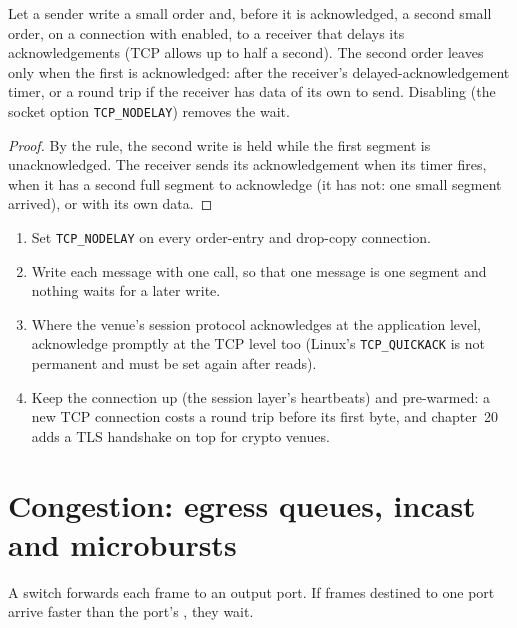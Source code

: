 \begin{proposition}\label{prop:nw:networking-for-trading:nagle}
Let a sender write a small order and, before it is acknowledged, a second small order, on a connection with 
enabled, to a receiver that delays its acknowledgements (TCP allows up to half a second). The second order leaves only when
the first is acknowledged: after the receiver's delayed-acknowledgement timer, or a round trip if the receiver has data of its
own to send. Disabling  (the socket option \texttt{TCP\_NODELAY}) removes the wait.
\end{proposition}

\begin{proof}
By the rule, the second write is held while the first segment is unacknowledged. The receiver sends its acknowledgement when
its timer fires, when it has a second full segment to acknowledge (it has not: one small segment arrived), or with its own data.
\end{proof}

\begin{method}\label{met:nw:networking-for-trading:socket}
\begin{enumerate}
\item Set \texttt{TCP\_NODELAY} on every order-entry and drop-copy connection.
\item Write each message with one call, so that one message is one segment and nothing waits for a later write.
\item Where the venue's session protocol acknowledges at the application level, acknowledge promptly at the TCP level too
  (Linux's \texttt{TCP\_QUICKACK} is not permanent and must be set again after reads).
\item Keep the connection up (the session layer's heartbeats) and pre-warmed: a new TCP connection costs a round trip before
  its first byte, and chapter~20 adds a TLS handshake on top for crypto venues.
\end{enumerate}
\end{method}

\section{Congestion: egress queues, incast and microbursts}

A switch forwards each frame to an output port. If frames destined to one port arrive faster than the port's , they
wait.

